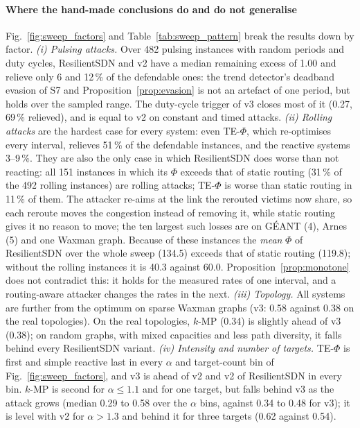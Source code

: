 \paragraph{Where the hand-made conclusions do and do not generalise}
Fig.~\ref{fig:sweep_factors} and Table~\ref{tab:sweep_pattern} break the results down by factor.
\emph{(i) Pulsing attacks.} Over 482 pulsing instances with random periods and duty cycles,
ResilientSDN and v2 have a median remaining excess of 1.00 and relieve only 6 and 12\,\% of the
defendable ones: the trend detector's deadband evasion of S7 and Proposition~\ref{prop:evasion} is
not an artefact of one period, but holds over the sampled range. The duty-cycle trigger of v3 closes
most of it (0.27, 69\,\% relieved), and is equal to v2 on constant and timed attacks.
\emph{(ii) Rolling attacks} are the hardest case for every system: even TE-$\Phi$, which re-optimises
every interval, relieves 51\,\% of the defendable instances, and the reactive systems 3--9\,\%.
They are also the only case in which ResilientSDN does worse than not reacting: all 151 instances in
which its $\Phi$ exceeds that of static routing (31\,\% of the 492 rolling instances) are rolling
attacks; TE-$\Phi$ is worse than static routing in 11\,\% of them. The attacker re-aims at the link
the rerouted victims now share, so each reroute moves the congestion instead of removing it, while
static routing gives it no reason to move; the ten largest such losses are on G\'EANT (4), Arnes (5)
and one Waxman graph. Because of these instances the \emph{mean} $\Phi$ of ResilientSDN over the
whole sweep (134.5) exceeds that of static routing (119.8); without the rolling instances it is 40.3
against 60.0. Proposition~\ref{prop:monotone} does not contradict this: it holds for the measured
rates of one interval, and a routing-aware attacker changes the rates in the next.
\emph{(iii) Topology.} All systems are further from the optimum on sparse Waxman graphs (v3: 0.58
against 0.38 on the real topologies). On the real topologies, $k$-MP (0.34) is slightly ahead of v3
(0.38); on random graphs, with mixed capacities and less path diversity, it falls behind every
ResilientSDN variant. \emph{(iv) Intensity and number of targets.} TE-$\Phi$ is first and simple
reactive last in every $\alpha$ and target-count bin of Fig.~\ref{fig:sweep_factors}, and v3 is ahead
of v2 and v2 of ResilientSDN in every bin. $k$-MP is second for $\alpha\le1.1$ and for one target, but
falls behind v3 as the attack grows (median 0.29 to 0.58 over the $\alpha$ bins, against 0.34 to 0.48
for v3); it is level with v2 for $\alpha>1.3$ and behind it for three targets (0.62 against 0.54).

